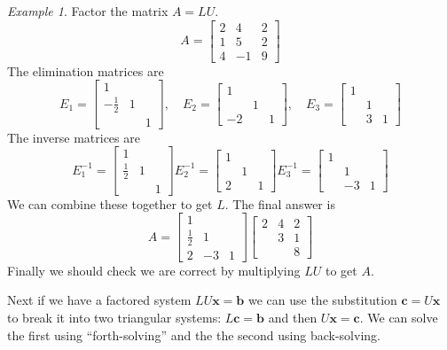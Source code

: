 \documentclass[11pt,oneside]{amsbook}
\theoremstyle{definition}
\theoremstyle{plain}
\theoremstyle{definition}
\theoremstyle{remark}
\newtheorem{example}[theorem]{Example}
\numberwithin{equation}{section}
\numberwithin{figure}{section}
\begin{document}
\begin{example}
  Factor the matrix $A=LU$.
  \[A=\begin{bmatrix}2&4&2\\1&5&2\\4&-1&9\end{bmatrix}
  \]
  The elimination matrices are
  \[E_1=\begin{bmatrix}1\\-\frac12&1\\&&1\end{bmatrix},\quad
    E_2=\begin{bmatrix}1\\&1\\-2&&1\end{bmatrix},\quad
    E_3=\begin{bmatrix}1\\&1\\&3&1\end{bmatrix}
  \]
  The inverse matrices are
  \[E_1^{-1}=\begin{bmatrix}1\\\frac12&1\\&&1\end{bmatrix}
    E_2^{-1}=\begin{bmatrix}1\\&1\\2&&1\end{bmatrix}
    E_3^{-1}=\begin{bmatrix}1\\&1\\&-3&1\end{bmatrix}
  \]
  We can combine these together to get $L$. The final answer is
  \[A=\begin{bmatrix}1&&\\\frac12&1&\\2&-3&1\end{bmatrix}
    \begin{bmatrix}2&4&2\\&3&1\\&&8\end{bmatrix}
  \]
  Finally we should check we are correct by multiplying $LU$ to get $A$.
\end{example}

Next if we have a factored system $LU\mathbf{x}=\mathbf{b}$ we can use the substitution $\mathbf{c}=U\mathbf{x}$ to break it into two triangular systems: $L\mathbf{c}=\mathbf{b}$ and then $U\mathbf{x}=\mathbf{c}$. We can solve the first using ``forth-solving'' and the the second using back-solving.
\end{document}
